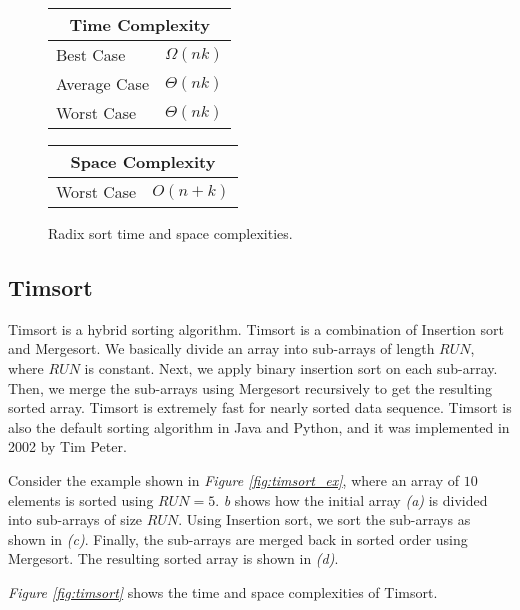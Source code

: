 \begin{figure}[!ht]
    \centering
    \begin{tabular}{l|l}
    \multicolumn{2}{c}{\textbf{Time Complexity}} \\
    \hline
    Best Case    & $\Omega(n k)$ \\
    Average Case & $\Theta(n k)$ \\
    Worst Case   & $\Theta(n k)$ \\
    \end{tabular}
    \quad\quad
    \begin{tabular}{l|l}
    \multicolumn{2}{c}{\textbf{Space Complexity}} \\
    \hline
    Worst Case   & $O(n + k)$
    \end{tabular}
    
    \caption{Radix sort time\cite{kazim2017} and space complexities\cite{big-o}.}
    \label{fig:radixsort}
\end{figure}


\subsection{Timsort}

Timsort is a hybrid sorting algorithm. Timsort is a combination of Insertion sort and Mergesort. We basically divide an array into sub-arrays of length $RUN$, where $RUN$ is constant. Next, we apply binary insertion sort on each sub-array. Then, we merge the sub-arrays using Mergesort recursively to get the resulting sorted array. Timsort is extremely fast for nearly sorted data sequence. Timsort is also the default sorting algorithm in Java and Python, and it was implemented in 2002 by Tim Peter. 

Consider the example shown in \textit{Figure \ref{fig:timsort_ex}}, where an array of $10$ elements is sorted using $RUN=5$. \textit{{b}} shows how the initial array \textit{(a)} is divided into sub-arrays of size $RUN$. Using Insertion sort, we sort the sub-arrays as shown in \textit{(c)}. Finally, the sub-arrays are merged back in sorted order using Mergesort. The resulting sorted array is shown in \textit{(d)}.

\textit{Figure \ref{fig:timsort}} shows the time and space complexities of Timsort.

